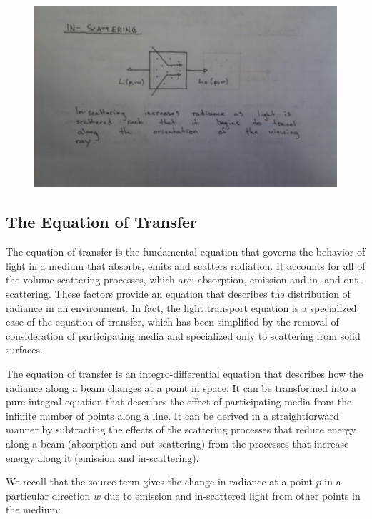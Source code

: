 \documentclass{article}
\begin{document}
\begin{figure}[h!]
	\centering
	\includegraphics[scale=0.5]{Images/InScattering}
\end{figure}

\subsection{The Equation of Transfer}

The equation of transfer is the fundamental equation that governs the behavior of light in a medium that absorbs, emits and scatters radiation.\cite{Chandrasekhar60} It accounts for all of the volume scattering processes, which are; absorption, emission and in- and out-scattering. These factors provide an equation that describes the distribution of radiance in an environment. In fact, the light transport equation is a specialized case of the equation of transfer, which has been simplified by the removal of consideration of participating media and specialized only to scattering from solid surfaces.\cite{Arvo93transferequations}

The equation of transfer is an integro-differential equation that describes how the radiance along a beam changes at a point in space. It can be transformed into a pure integral equation that describes the effect of participating media from the infinite number of points along a line. It can be derived in a straightforward manner by subtracting the effects of the scattering processes that reduce energy along a beam (absorption and out-scattering) from the processes that increase energy along it (emission and in-scattering). 

We recall that the source term gives the change in radiance at a point $p$ in a particular direction $w$ due to emission and in-scattered light from other points in the medium:
\end{document}
